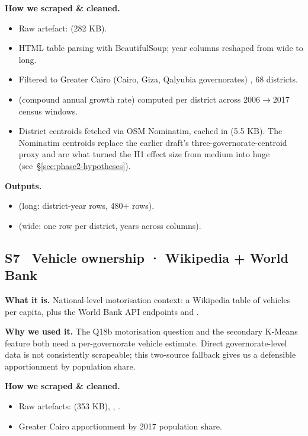 \textbf{How we scraped \& cleaned.}
\begin{itemize}
 \item Raw artefact:  (282 KB).
 \item HTML table parsing with BeautifulSoup; year columns reshaped
 from wide to long.
 \item Filtered to Greater Cairo (Cairo, Giza, Qalyubia governorates)
, 68 districts.
 \item {} (compound annual growth rate) computed per district
 across 2006$\to$2017 census windows.
 \item District centroids fetched via OSM Nominatim, cached in
  (5.5 KB). The Nominatim
 centroids replace the earlier draft's three-governorate-centroid
 proxy and are what turned the H1 effect size from medium into
 huge (see~\S\ref{sec:phase2-hypotheses}).
\end{itemize}

\textbf{Outputs.}
\begin{itemize}
 \item {} (long: district-year rows, 480+ rows).
 \item {} (wide: one row per district, years
 across columns).
\end{itemize}


\subsection{S7 \textbullet\ Vehicle ownership · Wikipedia + World Bank}

\textbf{What it is.} National-level motorisation context: a Wikipedia
table of vehicles per capita, plus the World Bank API endpoints
 and .

\textbf{Why we used it.} The Q18b motorisation question and the
secondary K-Means feature both need a per-governorate vehicle
estimate. Direct governorate-level data is not consistently scrapeable;
this two-source fallback gives us a defensible apportionment by
population share.

\textbf{How we scraped \& cleaned.}
\begin{itemize}
 \item Raw artefacts: 
 (353 KB), ,
 .
 \item Greater Cairo apportionment by 2017 population share.
\end{itemize}

